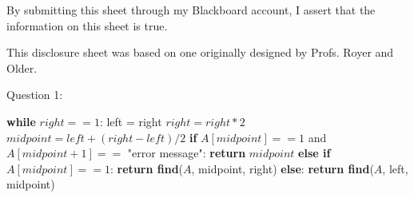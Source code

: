 \documentclass[12pt]{article}
\begin{document}
\vspace*{40ex}

By submitting this sheet through my Blackboard account, I assert that the information on this sheet is true.


\hfill {\tiny This disclosure sheet was based on one originally designed
  by
  Profs. Royer and Older.}
  
 \pagebreak
\large Question 1: \vspace{5mm} \\
\normalsize 
\begin{algorithm}
\begin{algorithmic}
    \State \textbf{while} $right == 1$:
    \State \hspace{0.8cm}  left = right
    \State \hspace{0.8cm}  $right = right * 2$
    \State \textbf{}$midpoint = left + (right - left) / 2$
    \State \textbf{if} $A[midpoint] == 1$ and $A[midpoint + 1] == $ "error message":
    \State \hspace{0.8cm}  \textbf{return} $midpoint$
    \State \textbf{else if} $A[midpoint] == 1$:
    \State \hspace{0.8cm}  \textbf{return find}($A$, midpoint, right)
    \State \textbf{else}:
    \State \hspace{0.8cm}  \textbf{return find}($A$, left, midpoint)
\EndFunction
\end{algorithmic}
\end{algorithm}\vspace{3mm}\\
\end{document}
